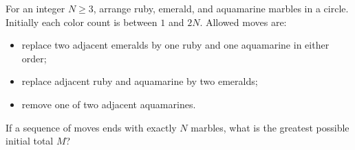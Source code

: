 For an integer $N\ge3$, arrange ruby, emerald, and aquamarine marbles in a circle. Initially each color count is between $1$ and $2N$. Allowed moves are:
\begin{itemize}
\item replace two adjacent emeralds by one ruby and one aquamarine in either order;
\item replace adjacent ruby and aquamarine by two emeralds;
\item remove one of two adjacent aquamarines.
\end{itemize}
If a sequence of moves ends with exactly $N$ marbles, what is the greatest possible initial total $M$?

